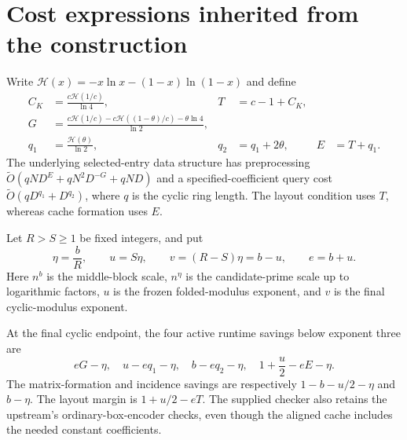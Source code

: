 \documentclass[11pt,a4paper]{article}
\newcommand{\HH}{\mathcal H}
\newcommand{\softO}{\widetilde O}
\begin{document}
\section{Cost expressions inherited from the construction}
Write $\HH(x)=-x\ln x-(1-x)\ln(1-x)$ and define
\begin{align}
 C_K&=\frac{c\HH(1/c)}{\ln4}, & T&=c-1+C_K,\label{eq:T}\\
 G&=\frac{c\HH(1/c)-c\HH((1-\theta)/c)-\theta\ln4}{\ln2},\label{eq:G}\\
 q_1&=\frac{\HH(\theta)}{\ln2}, & q_2&=q_1+2\theta,
 & E&=T+q_1.\label{eq:q}
\end{align}
The underlying selected-entry data structure has preprocessing
$\softO(qND^E+qN^2D^{-G}+qND)$ and a specified-coefficient query cost
$\softO(qD^{q_1}+D^{q_2})$, where $q$ is the cyclic ring length.
The layout condition uses $T$, whereas cache formation uses $E$.

Let $R>S\ge1$ be fixed integers, and put
\[
 \eta=\frac bR,\qquad u=S\eta,\qquad
 v=(R-S)\eta=b-u,\qquad e=b+u.
\]
Here $n^b$ is the middle-block scale, $n^\eta$ is the candidate-prime
scale up to logarithmic factors, $u$ is the frozen folded-modulus
exponent, and $v$ is the final cyclic-modulus exponent.

At the final cyclic endpoint, the four active runtime savings below
exponent three are
\begin{equation}
 \boxed{eG-\eta,\quad u-eq_1-\eta,\quad b-eq_2-\eta,
 \quad 1+\frac u2-eE-\eta.}\label{eq:four}
\end{equation}
The matrix-formation and incidence savings are respectively
$1-b-u/2-\eta$ and $b-\eta$. The layout margin is
$1+u/2-eT$. The supplied checker also retains the upstream's
ordinary-box-encoder checks, even though the aligned cache includes
the needed constant coefficients.
\end{document}
